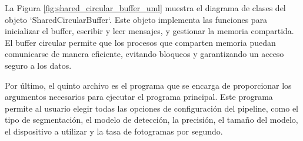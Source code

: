 \documentclass[11pt,spanish,listoffigures,listoftables]{tfgetsinf}
\begin{document}
   La Figura \ref{fig:shared_circular_buffer_uml} muestra el diagrama de clases del objeto `SharedCircularBuffer`. Este objeto implementa las funciones para inicializar el buffer, escribir y leer mensajes, y gestionar la memoria compartida. El buffer circular permite que los procesos que comparten memoria puedan comunicarse de manera eficiente, evitando bloqueos y garantizando un acceso seguro a los datos.

   


   Por último, el quinto archivo es el programa que se encarga de proporcionar los argumentos necesarios para ejecutar el programa principal. Este programa permite al usuario elegir todas las opciones de configuración del pipeline, como el tipo de segmentación, el modelo de detección, la precisión, el tamaño del modelo, el dispositivo a utilizar y la tasa de fotogramas por segundo.


   


\printglossaries
\end{document}

